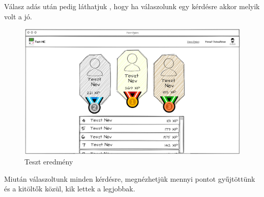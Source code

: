 Válasz adás után pedig láthatjuk , hogy ha válaszolunk egy kérdésre akkor melyik volt a jó.

\begin{figure}[H]
    \centering
    \includegraphics[width=\linewidth]{images/test3_wireframe.png}
    \caption{Teszt eredmény}
    \label{fig:test_finished}
\end{figure}

Miután válaszoltunk minden kérdésre, megnézhetjük mennyi pontot gyűjtöttünk és a kitöltők közül, kik lettek a legjobbak. 



